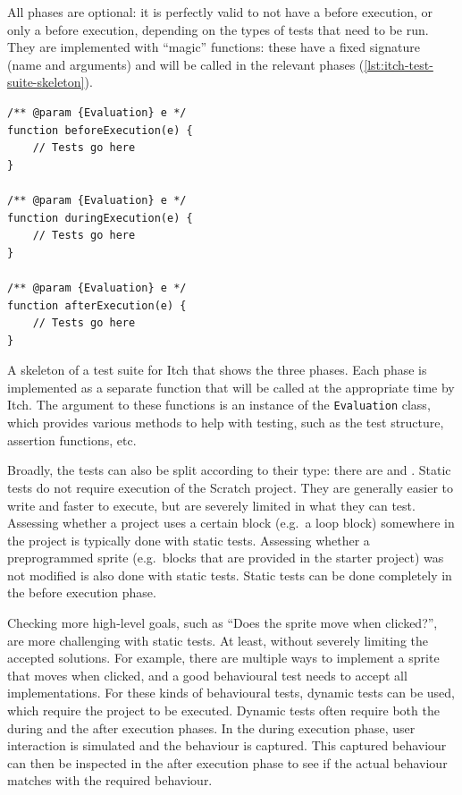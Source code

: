 \documentclass[../main]{subfiles}
\begin{document}
All phases are optional: it is perfectly valid to not have a before execution, or only a before execution, depending on the types of tests that need to be run.
They are implemented with ``magic'' functions: these have a fixed signature (name and arguments) and will be called in the relevant phases (\cref{lst:itch-test-suite-skeleton}).

\begin{listing}
    \begin{verbatim}
/** @param {Evaluation} e */
function beforeExecution(e) {
    // Tests go here
}

/** @param {Evaluation} e */
function duringExecution(e) {
    // Tests go here
}

/** @param {Evaluation} e */
function afterExecution(e) {
    // Tests go here
}
    \end{verbatim}
    \caption[]{
        A skeleton of a test suite for Itch that shows the three phases.
        Each phase is implemented as a separate function that will be called at the appropriate time by Itch.
        The argument to these functions is an instance of the \texttt{Evaluation} class, which provides various methods to help with testing, such as the test structure, assertion functions, etc.
    }
    \label{lst:itch-test-suite-skeleton}
\end{listing}

Broadly, the tests can also be split according to their type: there are  and .
Static tests do not require execution of the Scratch project.
They are generally easier to write and faster to execute, but are severely limited in what they can test.
Assessing whether a project uses a certain block (e.g.\ a loop block) somewhere in the project is typically done with static tests.
Assessing whether a preprogrammed sprite (e.g.\ blocks that are provided in the starter project) was not modified is also done with static tests.
Static tests can be done completely in the before execution phase.

Checking more high-level goals, such as ``Does the sprite move when clicked?'', are more challenging with static tests.
At least, without severely limiting the accepted solutions.
For example, there are multiple ways to implement a sprite that moves when clicked, and a good behavioural test needs to accept all implementations.
For these kinds of behavioural tests, dynamic tests can be used, which require the project to be executed.
Dynamic tests often require both the during and the after execution phases.
In the during execution phase, user interaction is simulated and the behaviour is captured.
This captured behaviour can then be inspected in the after execution phase to see if the actual behaviour matches with the required behaviour.
\end{document}
